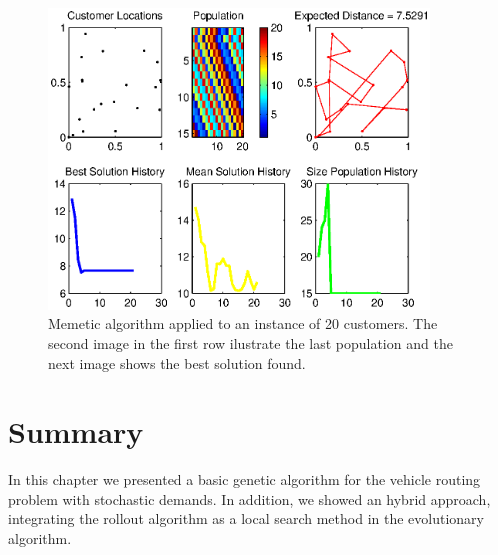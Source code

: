 \begin{figure}[!htbp]
  \begin{center}
   \includegraphics[width=0.9\textwidth]{Images/Chapter3/mvi_20r4_m_memetic.eps}
  \end{center}
    \caption{Memetic algorithm applied to an instance of 20 customers. The second image in the first row ilustrate the last population and the next image shows the best solution found.}\label{fig:memetic_mvi_20r4_m}
\end{figure}

\section{Summary}

In this chapter we presented a basic genetic algorithm for the vehicle routing problem with stochastic demands. In addition, we showed an hybrid approach, integrating the rollout algorithm as a local search method in the evolutionary algorithm.